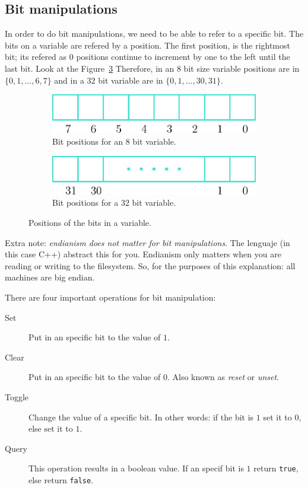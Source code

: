 \subsection{Bit manipulations}

In order to do bit manipulations, we need to be able to refer to a specific bit.
The bits on a variable are refered by a position.
The first position, is the rightmost bit; its refered as $0$ positions continue to increment by one to the left until the last bit.
Look at the Figure~\ref{fig:bitPos}
Therefore, in an $8$ bit size variable positions are in $\{ 0, 1, \ldots, 6, 7 \}$ and in a $32$ bit variable are in $\{ 0, 1, \ldots, 30, 31 \}$.

\begin{figure}[htb]
  \centering
  \begin{subfigure}[b]{0.35\textwidth}
    \includegraphics[width=\textwidth]{img/bitPositions}
    \caption{Bit positions for an $8$ bit variable.}
    \label{fig:bitPosa}
  \end{subfigure}
  \hspace*{1cm}
  \begin{subfigure}[b]{0.35\textwidth}
    \includegraphics[width=\textwidth]{img/bitPositions2}
    \caption{Bit positions for a $32$ bit variable.}
    \label{fig:bitPosb}
  \end{subfigure}
  \caption{Positions of the bits in a variable.}
  \label{fig:bitPos}
\end{figure}

Extra note: \emph{endianism does not matter for bit manipulations}.
The lenguaje (in this case C++) abstract this for you.
Endianism only matters when you are reading or writing to the filesystem.
So, for the purposes of this explanation: all machines are big endian.

There are four important operations for bit manipulation:
\begin{description}
\item[Set] Put in an specific bit to the value of $1$.
\item[Clear] Put in an specific bit to the value of $0$. Also known as \emph{reset} or \emph{unset}.
\item[Toggle] Change the value of a specific bit. In other words: if the bit is $1$ set it to $0$, else set it to $1$.
\item[Query] This operation results in a boolean value. If an specif bit is $1$ return \texttt{true}, else return \texttt{false}.
\end{description}

